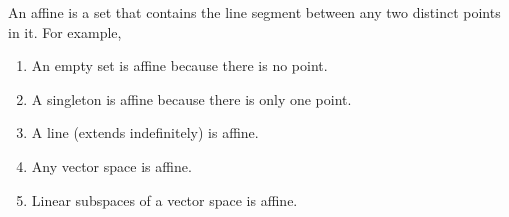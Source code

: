 \begin{definition}
	An affine is a set that contains the line segment between any two distinct points in it. For example,
	\begin{enumerate}
		\item An empty set is affine because there is no point.
		\item A singleton is affine because there is only one point.
		\item A line (extends indefinitely) is affine.
		\item Any vector space is affine.
		\item Linear subspaces of a vector space is affine.	
	\end{enumerate} 
\end{definition} 

\begin{definition}
	
\end{definition} 



